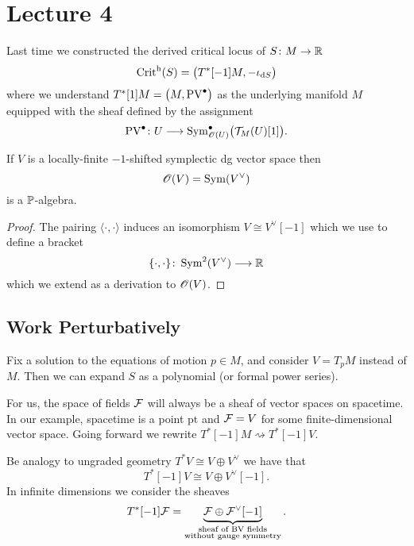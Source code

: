 \chapter{Lecture 4}

Last time we constructed the derived critical locus of $S \colon M \to \mathbb{R}$
\begin{equation*}
  \operatorname{Crit}^{\mathrm{h}}(S) = \bigl( T^*[-1] M, - \iota_{\mathrm{d} S} \bigr)
\end{equation*}
where we understand $T^*[1] M = \bigl( M, \operatorname{PV}^\bullet \bigr)$ as the underlying manifold $M$ equipped with the sheaf defined by the assignment
\begin{equation*}
  \operatorname{PV}^\bullet \colon U \longrightarrow
  \operatorname{Sym}_{\mathscr{O}(U)}^\bullet \bigl( \mathcal{T}_M (U) [1] \bigr).
\end{equation*}

\begin{proposition}
    If $V$ is a locally-finite $-1$-shifted symplectic dg vector space then
    \begin{equation*}
      \mathscr{O}(V) = \operatorname{Sym}(V^\vee)
    \end{equation*}
    is a $\mathbb{P}$-algebra.
\end{proposition}
\begin{proof}
  The pairing $\langle \cdot, \cdot \rangle$ induces an isomorphism $V \cong V^\vee[-1]$ which we use to define a bracket
  \begin{equation*}
    \{\cdot, \cdot\} \colon \operatorname{Sym}^2(V^\vee) \longrightarrow \mathbb{R}
  \end{equation*}
  which we extend as a derivation to $\mathscr{O}(V)$.
\end{proof}

\section{Work Perturbatively}

Fix a solution to the equations of motion $p \in M$, and consider $V = T_p M$ instead of $M$.
Then we can expand $S$ as a polynomial (or formal power series).

For us, the space of fields $\mathcal{F}$ will always be a sheaf of vector spaces on spacetime.
In our example, spacetime is a point $\text{pt}$ and $\mathcal{F} = V$ for some finite-dimensional vector space.
Going forward we rewrite $T^* [-1]M \rightsquigarrow T^* [-1]V$.

\begin{remark}
  Be analogy to ungraded geometry $T^*V \cong V \oplus V^\vee$ we have that
  \begin{equation*}
    T^* [-1]V \cong V \oplus V^\vee [-1].
  \end{equation*}
  In infinite dimensions we consider the sheaves
  \begin{equation*}
    T^*[-1] \mathcal{F}
    = \underbrace{\mathcal{F} \oplus  \mathcal{F}^{\vee}[-1]}_{\substack{
    \text{sheaf of BV fields}\\\text{without gauge symmetry}}}.
  \end{equation*}
\end{remark}

